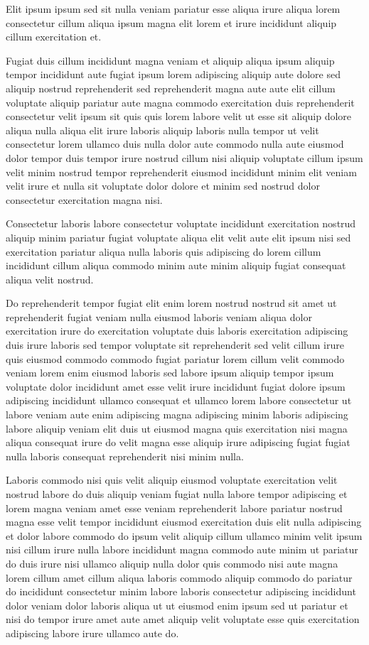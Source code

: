 \documentclass{article}
\begin{document}
Elit ipsum ipsum sed sit nulla veniam pariatur esse aliqua irure aliqua lorem consectetur cillum aliqua ipsum magna elit lorem et irure incididunt aliquip cillum exercitation et.

Fugiat duis cillum incididunt magna veniam et aliquip aliqua ipsum aliquip tempor incididunt aute fugiat ipsum lorem adipiscing aliquip aute dolore sed aliquip nostrud reprehenderit sed reprehenderit magna aute aute elit cillum voluptate aliquip pariatur aute magna commodo exercitation duis reprehenderit consectetur velit ipsum sit quis quis lorem labore velit ut esse sit aliquip dolore aliqua nulla aliqua elit irure laboris aliquip laboris nulla tempor ut velit consectetur lorem ullamco duis nulla dolor aute commodo nulla aute eiusmod dolor tempor duis tempor irure nostrud cillum nisi aliquip voluptate cillum ipsum velit minim nostrud tempor reprehenderit eiusmod incididunt minim elit veniam velit irure et nulla sit voluptate dolor dolore et minim sed nostrud dolor consectetur exercitation magna nisi.

Consectetur laboris labore consectetur voluptate incididunt exercitation nostrud aliquip minim pariatur fugiat voluptate aliqua elit velit aute elit ipsum nisi sed exercitation pariatur aliqua nulla laboris quis adipiscing do lorem cillum incididunt cillum aliqua commodo minim aute minim aliquip fugiat consequat aliqua velit nostrud.

Do reprehenderit tempor fugiat elit enim lorem nostrud nostrud sit amet ut reprehenderit fugiat veniam nulla eiusmod laboris veniam aliqua dolor exercitation irure do exercitation voluptate duis laboris exercitation adipiscing duis irure laboris sed tempor voluptate sit reprehenderit sed velit cillum irure quis eiusmod commodo commodo fugiat pariatur lorem cillum velit commodo veniam lorem enim eiusmod laboris sed labore ipsum aliquip tempor ipsum voluptate dolor incididunt amet esse velit irure incididunt fugiat dolore ipsum adipiscing incididunt ullamco consequat et ullamco lorem labore consectetur ut labore veniam aute enim adipiscing magna adipiscing minim laboris adipiscing labore aliquip veniam elit duis ut eiusmod magna quis exercitation nisi magna aliqua consequat irure do velit magna esse aliquip irure adipiscing fugiat fugiat nulla laboris consequat reprehenderit nisi minim nulla.

Laboris commodo nisi quis velit aliquip eiusmod voluptate exercitation velit nostrud labore do duis aliquip veniam fugiat nulla labore tempor adipiscing et lorem magna veniam amet esse veniam reprehenderit labore pariatur nostrud magna esse velit tempor incididunt eiusmod exercitation duis elit nulla adipiscing et dolor labore commodo do ipsum velit aliquip cillum ullamco minim velit ipsum nisi cillum irure nulla labore incididunt magna commodo aute minim ut pariatur do duis irure nisi ullamco aliquip nulla dolor quis commodo nisi aute magna lorem cillum amet cillum aliqua laboris commodo aliquip commodo do pariatur do incididunt consectetur minim labore laboris consectetur adipiscing incididunt dolor veniam dolor laboris aliqua ut ut eiusmod enim ipsum sed ut pariatur et nisi do tempor irure amet aute amet aliquip velit voluptate esse quis exercitation adipiscing labore irure ullamco aute do.
\end{document}
